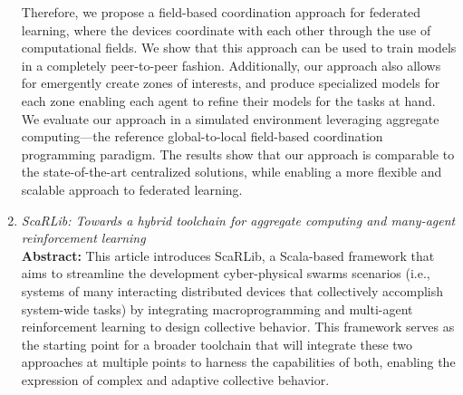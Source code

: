 \documentclass[runningheads]{llncs}
\begin{document}
\begin{enumerate}
    Therefore, we propose a field-based coordination approach for federated learning, where the devices coordinate with each other through the use of 
     computational fields. 
    We show that this approach can be used to train models in a completely peer-to-peer fashion. 
    Additionally, our approach also allows for emergently create zones of interests, and produce specialized models for each zone enabling each agent 
     to refine their models for the tasks at hand.
    We evaluate our approach in a simulated environment leveraging aggregate computing—the reference global-to-local field-based coordination programming paradigm. 
    The results show that our approach is comparable to the state-of-the-art centralized solutions, while enabling a more flexible and scalable approach 
     to federated learning.
    \item \emph{ScaRLib: Towards a hybrid toolchain for aggregate computing and many-agent reinforcement learning}~\cite{DBLP:journals/scp/DominiCAV24} \\
    \textbf{Abstract: }
    This article introduces ScaRLib, a Scala-based framework that aims to streamline the development cyber-physical swarms scenarios 
     (i.e., systems of many interacting distributed devices that collectively accomplish system-wide tasks) by integrating macroprogramming and multi-agent 
     reinforcement learning to design collective behavior. 
     This framework serves as the starting point for a broader toolchain that will integrate these two approaches at multiple points to harness the 
     capabilities of both, enabling the expression of complex and adaptive collective behavior.


\end{enumerate}
\end{document}

